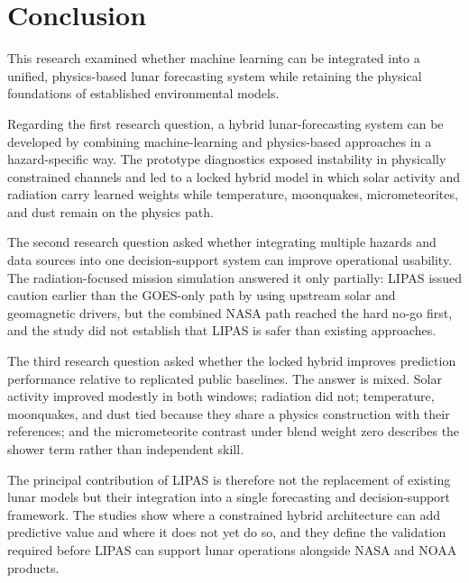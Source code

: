 \section{Conclusion}
\label{sec:conclusion}

This research examined whether machine learning can be integrated into a unified, physics-based lunar forecasting system while retaining the physical foundations of established environmental models.

Regarding the first research question, a hybrid lunar-forecasting system can be developed by combining machine-learning and physics-based approaches in a hazard-specific way. The prototype diagnostics exposed instability in physically constrained channels and led to a locked hybrid model in which solar activity and radiation carry learned weights while temperature, moonquakes, micrometeorites, and dust remain on the physics path.

The second research question asked whether integrating multiple hazards and data sources into one decision-support system can improve operational usability. The radiation-focused mission simulation answered it only partially: LIPAS issued caution earlier than the GOES-only path by using upstream solar and geomagnetic drivers, but the combined NASA path reached the hard no-go first, and the study did not establish that LIPAS is safer than existing approaches.

The third research question asked whether the locked hybrid improves prediction performance relative to replicated public baselines. The answer is mixed. Solar activity improved modestly in both windows; radiation did not; temperature, moonquakes, and dust tied because they share a physics construction with their references; and the micrometeorite contrast under blend weight zero describes the shower term rather than independent skill.

The principal contribution of LIPAS is therefore not the replacement of existing lunar models but their integration into a single forecasting and decision-support framework. The studies show where a constrained hybrid architecture can add predictive value and where it does not yet do so, and they define the validation required before LIPAS can support lunar operations alongside NASA and NOAA products.
